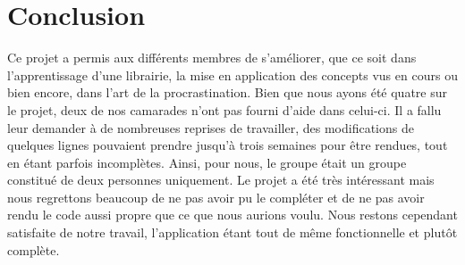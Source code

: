 \chapter{Conclusion}

	Ce projet a permis aux différents membres de s'améliorer, que ce soit dans l'apprentissage d'une librairie, la mise en application des concepts vus en cours ou bien encore, dans l'art de la procrastination. Bien que nous ayons été quatre sur le projet, deux de nos camarades n'ont pas fourni d'aide dans celui-ci. Il a fallu leur demander à de nombreuses reprises de travailler, des modifications de quelques lignes pouvaient prendre jusqu'à trois semaines pour être rendues, tout en étant parfois incomplètes. Ainsi, pour nous, le groupe était un groupe constitué de deux personnes uniquement. Le projet a été très intéressant mais nous regrettons beaucoup de ne pas avoir pu le compléter et de ne pas avoir rendu le code aussi propre que ce que nous aurions voulu. Nous restons cependant satisfaite de notre travail, l'application étant tout de même fonctionnelle et plutôt complète.
